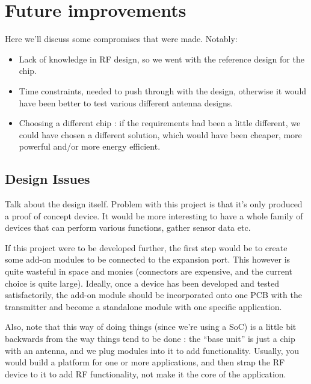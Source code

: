 \chapter{Future improvements}\label{ch:improvements}

Here we'll discuss some compromises that were made. Notably:

\begin{itemize}
  \item Lack of knowledge in RF design, so we went with the reference design for
    the chip.
  \item Time constraints, needed to push through with the design, otherwise it
    would have been better to test various different antenna designs. 
  \item Choosing a different chip : if the requirements had been a little
    different, we could have chosen a different solution, which would have been
    cheaper, more powerful and/or more energy efficient.
\end{itemize}

\section{Design Issues}

Talk about the design itself. Problem with this project is that it's only
produced a proof of concept device. It would be more interesting to have a whole
family of devices that can perform various functions, gather sensor data etc.

If this project were to be developed further, the first step would be to create
some add-on modules to be connected to the expansion port. This however is quite
wasteful in space and monies (connectors are expensive, and the current choice
is quite large). Ideally, once a device has been developed and tested
satisfactorily, the add-on module should be incorporated onto one PCB with the
transmitter and become a standalone module with one specific application.

Also, note that this way of doing things (since we're using a SoC) is a little
bit backwards from the way things tend to be done : the ``base unit'' is just
a chip with an antenna, and we plug modules into it to add functionality.
Usually, you would build a platform for one or more applications, and then strap
the RF device to it to add RF functionality, not make it the core of the
application.

